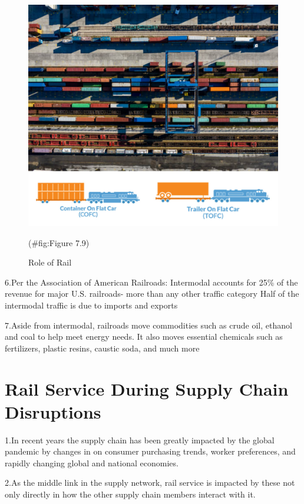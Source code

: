\documentclass[
]{book}
\begin{document}
\begin{figure}

{\centering \includegraphics{./Images/supplychain/Role of Rail} 

}

\caption{Role of Rail}(\#fig:Figure 7.9)
\end{figure}

6.Per the Association of American Railroads:
Intermodal accounts for 25\% of the revenue for major U.S. railroads- more than any other traffic category
Half of the intermodal traffic is due to imports and exports

7.Aside from intermodal, railroads move commodities such as crude oil, ethanol and coal to help meet energy needs. It also moves essential chemicals such as fertilizers, plastic resins, caustic soda, and much more

\hypertarget{SupplyChain-Railportservice}{%
\section{Rail Service During Supply Chain Disruptions}\label{SupplyChain-Railportservice}}

1.In recent years the supply chain has been greatly impacted by the global pandemic by changes in on consumer purchasing trends, worker preferences, and rapidly changing global and national economies.

2.As the middle link in the supply network, rail service is impacted by these not only directly in how the other supply chain members interact with it.
\end{document}
